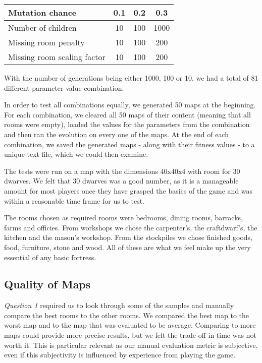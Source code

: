 \begin{center}
	\begin{tabular}{| l | c | c | c | }
		\hline
	  	Mutation chance 			& 0.1 & 0.2 & 0.3 \\ \hline
	  	Number of children  		& 10 & 100 & 1000 \\ \hline
	 	Missing room penalty 		& 10 & 100 & 200 \\ \hline
	  	Missing room scaling factor 	& 10 & 100 & 200 \\ \hline
	\end{tabular}
\end{center}

With the number of generations being either 1000, 100 or 10, we had a total of 81 different parameter value combination. 

In order to test all combinations equally, we generated 50 maps at the beginning. For each combination, we cleared all 50 maps of their content (meaning that all rooms were empty), loaded the values for the parameters from the combination and then ran the evolution on every one of the maps. At the end of each combination, we saved the generated maps - along with their fitness values - to a unique text file, which we could then examine.

The tests were run on a map with the dimensions 40x40x4 with room for 30 dwarves. We felt that 30 dwarves was a good number, as it is a manageable amount for most players once they have grasped the basics of the game and was within a reasonable time frame for us to test.

The rooms chosen as required rooms were bedrooms, dining rooms, barracks, farms and officies. From workshops we chose the carpenter's, the craftdwarf's, the kitchen and the mason's workshop. From the stockpiles we chose finished goods, food, furniture, stone and wood. All of these are what we feel make up the very essential of any basic fortress.

\subsection{Quality of Maps}

\textit{Question 1} required us to look through some of the samples and manually compare the best rooms to the other rooms. We compared the best map to the worst map and to the map that was evaluated to be average. Comparing to more maps could provide more precise results, but we felt the trade-off in time was not worth it. This is particular relevant as our manual evaluation metric is subjective, even if this subjectivity is influenced by experience from playing the game.

